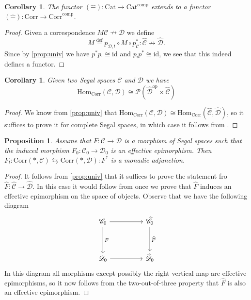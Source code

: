 \documentclass[a4paper, reqno]{amsart}
\newtheorem{prop}[theorem]{Proposition}
\newtheorem{cor}[theorem]{Corollary}
\theoremstyle{definition}
\newcommand\cC{\mathscr C}
\newcommand\cD{\mathscr D}
\newcommand\cP{\mathscr P}
\newcommand\id{\mathrm{id}}
\newcommand\mor{\mathrm{Hom}}
\newcommand\op{\mathrm{op}}
\newcommand\cat{\mathrm{Cat}}
\newcommand\comp{\mathrm{comp}}
\newcommand\bydef{\overset{\mathrm{def}}{=}}
\newcommand\corr{\mathrm{Corr}}
\begin{document}
\begin{cor}\label{cor:comp_corr}
The functor $(\widehat{-}):\cat\rightarrow\cat^\comp$ extends to a functor $(\widehat{-}):\corr\rightarrow\corr^\comp$.
\end{cor}
\begin{proof}
Given a correspondence $M\cC\nrightarrow\cD$ we define 
\[\widehat{M}\bydef p_{\cD,!}\circ M\circ p^*_\cC :\widehat{\cC}\nrightarrow\widehat{\cD}.\]
Since by \cref{prop:univ} we have $p^*p_!\cong\id$ and $p_!p^*\cong \id$, we see that this indeed defines a functor.
\end{proof}
\begin{cor}\label{cor:corr_comp}
Given two Segal spaces $\cC$ and $\cD$ we have 
\[\mor_{\corr}(\cC,\cD)\cong\cP(\widehat{\cD}^\op\times \widehat{\cC})\]
\end{cor}
\begin{proof}
We know from \cref{prop:univ} that $\mor_{\corr}(\cC,\cD)\cong\mor_{\corr}(\widehat{\cC},\widehat{\cD})$, so it suffices to prove it for complete Segal spaces, in which case it follows from \cite[Lemma 4.1]{ayala2017fibrations}.
\end{proof}
\begin{prop}\label{prop:monadicity}
Assume that $F:\cC\rightarrow\cD$ is a morphism of Segal spaces such that the induced morphism $F_0:\cC_0\rightarrow\cD_0$ is an effective epimorphism. Then $F_!:\corr(*,\cC)\leftrightarrows\corr(*,\cD):F^*$ is a monadic adjunction.
\end{prop}
\begin{proof}
It follows from \cref{prop:univ} that it suffices to prove the statement fro $\widehat{F}:\widehat{\cC}\rightarrow\widehat{\cD}$. In this case it would follow from \cite[Proposition 8.1.]{chu2019homotopy} once we prove that $\widehat{F}$ induces an effective epimorphism on the space of objects. Observe that we have the following diagram
\[
\begin{tikzcd}[row sep=huge, column sep=huge]
\cC_0\arrow[r]\arrow[d,"F"]&\widehat{\cC}_0\arrow[d,"\widehat{F}"]\\
\cD_0\arrow[r]&\widehat{\cD}_0
\end{tikzcd}
\]
In this diagram all morphisms except possibly the right vertical map are effective epimorphisms, so it now follows from the two-out-of-three property \cite[Corollary 6.2.3.12.]{lurie2009higher} that $\widehat{F}$ is also an effective epimorphism.
\end{proof}
\end{document}
